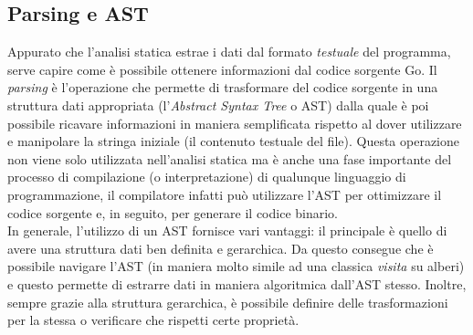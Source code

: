 \subsection{Parsing e AST}
Appurato che l'analisi statica estrae i dati dal formato \emph{testuale} del programma, serve capire come è possibile ottenere informazioni dal codice sorgente Go. Il \emph{parsing} è l'operazione che permette di trasformare del codice sorgente in una struttura dati appropriata (l'\emph{Abstract Syntax Tree} o AST\cite{Abstract_Syntax_Tree}) dalla quale è poi possibile ricavare informazioni in maniera semplificata rispetto al dover utilizzare e manipolare la stringa iniziale (il contenuto testuale del file). Questa operazione non viene solo utilizzata nell'analisi statica ma è anche una fase importante del processo di compilazione (o interpretazione) di qualunque linguaggio di programmazione, il compilatore infatti può utilizzare l'AST per ottimizzare il codice sorgente e, in seguito, per generare il codice binario.\\
In generale, l'utilizzo di un AST fornisce vari vantaggi: il principale è quello di avere una struttura dati ben definita e gerarchica. Da questo consegue che è possibile navigare l'AST (in maniera molto simile ad una classica \emph{visita} su alberi) e questo permette di estrarre dati in maniera algoritmica dall'AST stesso. Inoltre, sempre grazie alla struttura gerarchica, è possibile definire delle trasformazioni per la stessa o verificare che rispetti certe proprietà.